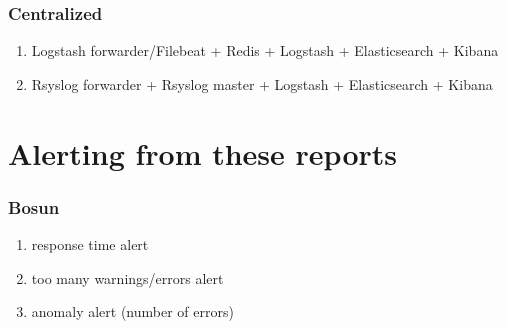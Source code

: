 \documentclass[13pt, ignorenonframetext]{beamer}
\begin{document}
\begin{frame}
\frametitle{Centralized}
\begin{enumerate}
    \item Logstash forwarder/Filebeat + Redis + Logstash + Elasticsearch + Kibana
    \item Rsyslog forwarder + Rsyslog master + Logstash + Elasticsearch + Kibana
\end{enumerate}
\end{frame}

\section{Alerting from these reports}
\begin{frame}
\frametitle{Bosun}
\begin{enumerate}
\item response time alert
\item too many warnings/errors alert
\item anomaly alert (number of errors)
\end{enumerate}
\end{frame}
\end{document}
